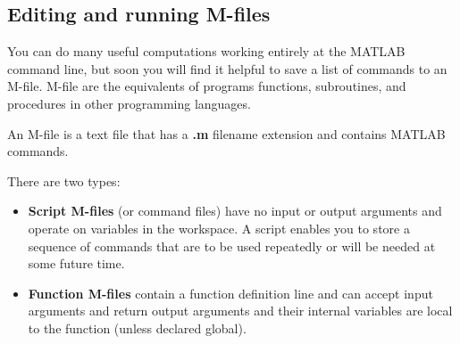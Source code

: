 \subsection{Editing and running M-files} You can do many useful computations
working entirely at the MATLAB command line, but soon you will find it helpful
to save a list of commands to an M-file.  M-file are the equivalents of programs
functions, subroutines, and procedures in other programming languages.

An M-file is a text file that has a \textbf{.m} filename extension and contains 
MATLAB commands.

There are two types:
\begin{itemize}
  \item{\textbf{Script M-files}} (or command files) have no input or output
  arguments and operate on variables in the workspace.  A script enables you to
  store a sequence of commands that are to be used repeatedly or will be needed
  at some future time.
  
  \item{\textbf{Function M-files}} contain a function definition line and can
  accept input arguments and return output arguments and their internal
  variables are local to the function (unless declared global).
\end{itemize}

